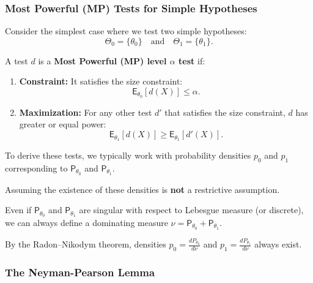 \subsubsection{Most Powerful (MP) Tests for Simple Hypotheses}

Consider the simplest case where we test two simple hypotheses:
\[ \Theta_0 = \{\theta_0\} \quad \text{and} \quad \Theta_1 = \{\theta_1\}. \]

\begin{definition}
A test $d$ is a \textbf{Most Powerful (MP) level $\alpha$ test} if:
\begin{enumerate}%
    \item \textbf{Constraint:} It satisfies the size constraint:
    \[ \mathsf{E}_{\theta_0}[d(X)] \leq \alpha. \]
    \item \textbf{Maximization:} For any other test $d'$ that satisfies the size constraint, $d$ has greater or equal power:
    \[ \mathsf{E}_{\theta_1}[d(X)] \geq \mathsf{E}_{\theta_1}[d'(X)]. \]
\end{enumerate}
\end{definition}

\begin{remark}
    
To derive these tests, we typically work with probability densities $p_0$ and $p_1$ corresponding to $\mathsf{P}_{\theta_0}$ and $\mathsf{P}_{\theta_1}$.

     Assuming the existence of these densities is \textbf{not} a restrictive assumption.

     Even if $\mathsf{P}_{\theta_0}$ and $\mathsf{P}_{\theta_1}$ are singular with respect to Lebesgue measure (or discrete), we can always define a dominating measure $\nu = \mathsf{P}_{\theta_0} + \mathsf{P}_{\theta_1}$.

     By the Radon--Nikodym theorem, densities $p_0 = \frac{dP_{\theta_0}}{d\nu}$ and $p_1 = \frac{dP_{\theta_1}}{d\nu}$ always exist.
\end{remark}

\subsubsection{The Neyman-Pearson Lemma}
\label{sec:neyman_pearson_lemma}

